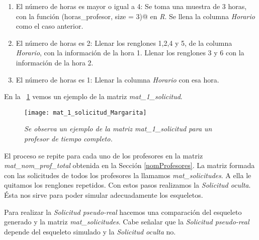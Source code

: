 \begin{enumerate}
\begin{enumerate}
\item El número de horas es mayor o igual a 4: Se toma una muestra de 3 horas, con la función \verb@sample(horas_profesor, size = 3)@ en \textit{R}. Se llena la columna \textit{Horario} como el caso anterior.

\item El número de horas es 2: Llenar los renglones 1,2,4 y 5, de la columna \textit{Horario}, con la información de la hora 1. Llenar los renglones 3 y 6 con la información de la hora 2.

\item El número de horas es 1: Llenar la columna \textit{Horario} con esa hora.
\end{enumerate}
\end{enumerate}

En la \figurename{~\ref{mat_1_solicitud_Margarita}} vemos un ejemplo de la matriz \textit{mat\_1\_solicitud}.

\begin{figure}[H]
\centering
\texttt{[image: mat\_1\_solicitud\_Margarita]} %
\caption[\textit{Ejemplo de matriz de solicitudes de un profesor}]{\textit{Se observa un ejemplo de la matriz mat\_1\_solicitud para un profesor de tiempo completo.}}\label{mat_1_solicitud_Margarita}
\end{figure}

El proceso se repite para cada uno de los profesores en la matriz \textit{mat\_nom\_prof\_total} obtenida en la Sección \ref{nomProfesores}. La matriz formada con las solicitudes de todos los profesores la llamamos \textit{mat\_solicitudes}. A ella le quitamos los renglones repetidos. Con estos pasos realizamos la \textit{Solicitud oculta}. Ésta nos sirve para poder simular adecuadamente los esqueletos.

Para realizar la \textit{Solicitud pseudo-real} hacemos una comparación del esqueleto generado y la matriz \textit{mat\_solicitudes}. Cabe señalar que la \textit{Solicitud pseudo-real} depende del esqueleto simulado y la \textit{Solicitud oculta} no.
